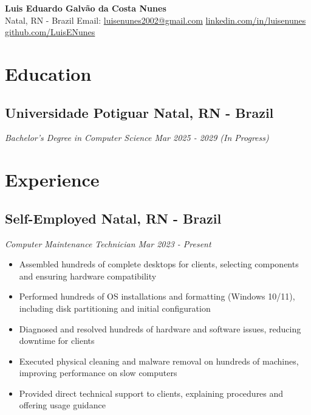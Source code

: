 \documentclass[a4paper,10pt]{article}
\begin{document}
\begin{center}
    {\LARGE \textbf{Luis Eduardo Galvão da Costa Nunes}} 
    \\ [0.1cm]
    Natal, RN - Brazil
    {\textbullet}
    Email: \href{mailto:luisenunes2002@gmail.com}{luisenunes2002@gmail.com} 
    {\textbullet}
    \href{https://www.linkedin.com/in/luisenunes}{linkedin.com/in/luisenunes} 
    {\textbullet}
    \href{https://github.com/LuisENunes}{github.com/LuisENunes}
\end{center}


\section{Education}
    \subsection*{\texorpdfstring{
            \textbf{Universidade Potiguar} \hfill Natal, RN - Brazil
        }{
            Universidade Potiguar -- Natal, RN - Brazil
        }}
    \textit{Bachelor's Degree in Computer Science \hfill Mar 2025 - 2029 (In Progress)}


\section{Experience}
    \subsection*{\texorpdfstring{
            \textbf{Self-Employed} \hfill Natal, RN - Brazil
        }{
            Self-Employed -- Natal, RN - Brazil
        }}
    \textit{Computer Maintenance Technician \hfill Mar 2023 - Present}
        \begin{itemize}
            \item Assembled hundreds of complete desktops for clients, selecting components and ensuring hardware compatibility
            \item Performed hundreds of OS installations and formatting (Windows 10/11), including disk partitioning and initial configuration
            \item Diagnosed and resolved hundreds of hardware and software issues, reducing downtime for clients
            \item Executed physical cleaning and malware removal on hundreds of machines, improving performance on slow computers
            \item Provided direct technical support to clients, explaining procedures and offering usage guidance
        \end{itemize}
\end{document}
